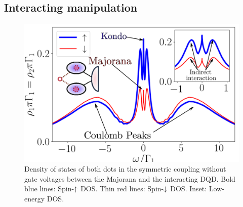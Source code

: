 





\subsection{Interacting manipulation \label{sec:DQD-M-Interacting}}

\begin{figure}[bt]
    \begin{center}
    \includegraphics[scale=0.52]{IMAGES/NRG/NRG-t1=t2.png}
    \caption{  \label{fig:NRG_Majorana}    Density of states of both dots in the symmetric coupling without gate voltages between the Majorana and the interacting DQD. Bold blue lines: Spin-$\uparrow$ DOS. Thin red lines: Spin-$\downarrow$ DOS. Inset: Low-energy DOS.\protect{}
    }
    \end{center}
\end{figure}

